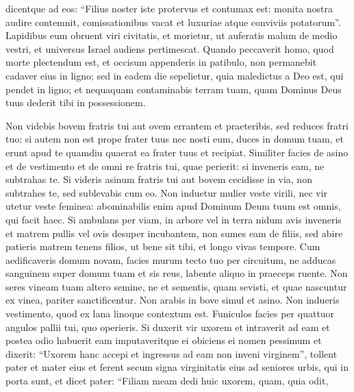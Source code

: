 \begin{biblechapter}
\begin{biblechapter}
\begin{biblechapter}
\begin{biblechapter}
\begin{biblechapter}
\begin{biblechapter}
\begin{biblechapter}
\begin{biblechapter}
\begin{biblechapter}
\begin{biblechapter}
\begin{biblechapter}
\begin{biblechapter}
\begin{biblechapter}
\begin{biblechapter}
\begin{biblechapter}
\begin{biblechapter}
\begin{biblechapter}
\begin{biblechapter}
\begin{biblechapter}
\begin{biblechapter}
\begin{biblechapter}
\verse dicentque ad eos: “Filius noster iste protervus et contumax est: monita nostra audire contemnit, comissationibus vacat et luxuriae atque conviviis potatorum”. 
\verse Lapidibus eum obruent viri civitatis, et morietur, ut auferatis malum de medio vestri, et universus Israel audiens pertimescat.
 \verse Quando peccaverit homo, quod morte plectendum est, et occisum appenderis in patibulo, 
\verse non permanebit cadaver eius in ligno; sed in eadem die sepelietur, quia maledictus a Deo est, qui pendet in ligno; et nequaquam contaminabis terram tuam, quam Dominus Deus tuus dederit tibi in possessionem.
 
\begin{biblechapter}
\verse Non videbis bovem fratris tui aut ovem errantem et praeteribis, sed reduces fratri tuo; 
 \verse si autem non est prope frater tuus nec nosti eum, duces in domum tuam, et erunt apud te quamdiu quaerat ea frater tuus et recipiat. 
\verse Similiter facies de asino et de vestimento et de omni re fratris tui, quae perierit: si inveneris eam, ne subtrahas te. 
\verse Si videris asinum fratris tui aut bovem cecidisse in via, non subtrahes te, sed sublevabis cum eo.
 \verse Non induetur mulier veste virili, nec vir utetur veste feminea: abominabilis enim apud Dominum Deum tuum est omnis, qui facit haec.
 \verse Si ambulans per viam, in arbore vel in terra nidum avis inveneris et matrem pullis vel ovis desuper incubantem, non sumes eam de filiis, 
\verse sed abire patieris matrem tenens filios, ut bene sit tibi, et longo vivas tempore.
 \verse Cum aedificaveris domum novam, facies murum tecto tuo per circuitum, ne adducas sanguinem super domum tuam et sis reus, labente aliquo in praeceps ruente.
 \verse Non seres vineam tuam altero semine, ne et sementis, quam sevisti, et quae nascuntur ex vinea, pariter sanctificentur. 
\verse Non arabis in bove simul et asino. 
\verse Non indueris vestimento, quod ex lana linoque contextum est.
 \verse Funiculos facies per quattuor angulos pallii tui, quo operieris.
 \verse Si duxerit vir uxorem et intraverit ad eam et postea odio habuerit eam 
\verse imputaveritque ei obiciens ei nomen pessimum et dixerit: “Uxorem hanc accepi et ingressus ad eam non inveni virginem”, 
\verse tollent pater et mater eius et ferent secum signa virginitatis eius ad seniores urbis, qui in porta sunt, 
 \verse et dicet pater: “Filiam meam dedi huic uxorem, quam, quia odit, 

\end{biblechapter}
\end{biblechapter}
\end{biblechapter}
\end{biblechapter}
\end{biblechapter}
\end{biblechapter}
\end{biblechapter}
\end{biblechapter}
\end{biblechapter}
\end{biblechapter}
\end{biblechapter}
\end{biblechapter}
\end{biblechapter}
\end{biblechapter}
\end{biblechapter}
\end{biblechapter}
\end{biblechapter}
\end{biblechapter}
\end{biblechapter}
\end{biblechapter}
\end{biblechapter}
\end{biblechapter}
